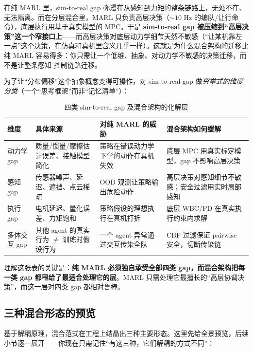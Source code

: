 \begin{insight}
在纯 MARL 里，sim-to-real gap 弥漫在从感知到力矩的整条链路上，无处不在、无法隔离。而在分层混合里，MARL 只负责高层决策（$\sim 10$ Hz 的编队/让行命令），底层执行用基于真实模型的 MPC。于是 \textbf{sim-to-real gap 被压缩到“高层决策”这一个窄接口上}——而高层决策对底层动力学细节天然不敏感（“让某机靠左一点”这个决策，在仿真和真机里含义几乎一样）。这就是为什么混合架构的迁移比纯 MARL 容易得多：你只需让一个低维、抽象、对动力学不敏感的决策迁移，而不是让整条感知-控制链路迁移。
\end{insight}

为了让“分布偏移”这个抽象概念变得可操作，对 sim-to-real gap 做\emph{穷举式的维度分类}（一个“思考框架”而非“记忆清单”）：

\begin{table}[H]\centering\small
\caption{四类 sim-to-real gap 及混合架构的化解层}
\label{tab:mh-gap}
\begin{tabular}{p{2.0cm}p{3.6cm}p{3.2cm}p{3.4cm}}
\toprule
维度 & 具体来源 & 对纯 MARL 的威胁 & 混合架构如何缓解 \\
\midrule
动力学 gap & 质量/惯量/摩擦估计误差、接触模型简化 & 策略在错误动力学下学的动作在真机失效 & 底层 MPC 用真实标定模型，gap 不影响高层决策 \\
感知 gap & 传感器噪声、延迟、遮挡、点云稀疏 & OOD 观测让策略输出危险动作 & 高层决策对感知细节不敏感；安全过滤用实时局部感知 \\
执行 gap & 电机延迟、量化误差、力矩饱和 & 策略假设的理想执行在真机打折 & 底层 WBC/PD 在真实执行约束内求解 \\
多体交互 gap & 其他 agent 的真实行为 $\ne$ 训练时假设行为 & 一个 agent 异常通过交互传染全队 & CBF 过滤保证 pairwise 安全，切断传染链 \\
\bottomrule
\end{tabular}
\end{table}

\noindent 理解这张表的关键是：\textbf{纯 MARL 必须独自承受全部四类 gap，而混合架构把每一类 gap 都甩给了最适合处理它的层}。MARL 只需处理它最擅长的“高层协调决策”，而这一层对四类 gap 都相对鲁棒。

\subsection{三种混合形态的预览}
\label{sec:mh-three-forms}

基于解耦原理，混合范式在工程上结晶出三种主要形态。这里先给全景预览，后续小节逐一展开——你现在只需记住“有这三种，它们解耦的方式不同”：

